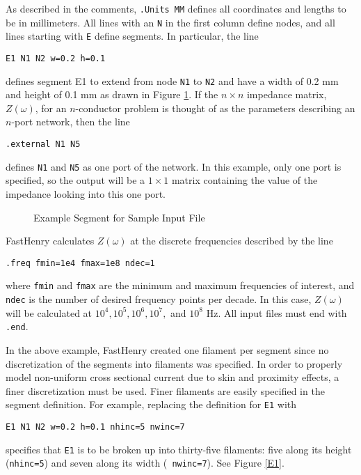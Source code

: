 As described in the comments, {\tt .Units MM} defines all
coordinates and lengths to be in millimeters.  All lines with an
{\tt N} in the first column define nodes, and all lines starting
with {\tt E} define segments.  In particular, the line
\begin{verbatim}
E1 N1 N2 w=0.2 h=0.1
\end{verbatim}
defines segment E1 to extend from node {\tt N1} to {\tt N2} and have a
width of 0.2 mm and height of 0.1 mm as drawn in Figure \ref{E1_2}.
If the $n \times n$ impedance matrix, $Z(\omega)$, 
for an $n$-conductor problem is
thought of as the parameters describing an $n$-port network, then the line 
\begin{verbatim}
.external N1 N5
\end{verbatim}
defines {\tt N1} and {\tt N5} as one port of the network.  In this
example, only one port is specified, so the output will be a $ 1
\times 1 $ matrix containing the value of the impedance looking into
this one port.

\begin{figure}
\centerline{
}
\caption{Example Segment for Sample Input File}
\label{E1_2}
\end{figure}

FastHenry
calculates $Z(\omega)$ at the discrete frequencies described by the
line
\begin{verbatim}
.freq fmin=1e4 fmax=1e8 ndec=1
\end{verbatim}
where {\tt fmin} and {\tt fmax} are the minimum and maximum
frequencies of interest, and {\tt ndec} is the number of desired frequency
points per decade.  In this case, $Z(\omega)$ will be calculated at
$10^4, 10^5, 10^6, 10^7,$ and $10^8$ Hz.   All input files must end with
{\tt .end}.

In the above example, FastHenry created one filament per segment since
no discretization of the segments into filaments
was specified.  In order to properly model non-uniform cross sectional
current due to skin and proximity effects, a finer discretization
must be used.  Finer filaments are easily specified in the segment
definition.  For example, replacing the definition for {\tt E1}
with
\begin{verbatim}
E1 N1 N2 w=0.2 h=0.1 nhinc=5 nwinc=7
\end{verbatim}
specifies that {\tt E1} is to be broken up into thirty-five filaments:
five along its height ({\tt nhinc=5}) and seven along its width ({\tt
nwinc=7}).  See Figure \ref{E1}.


